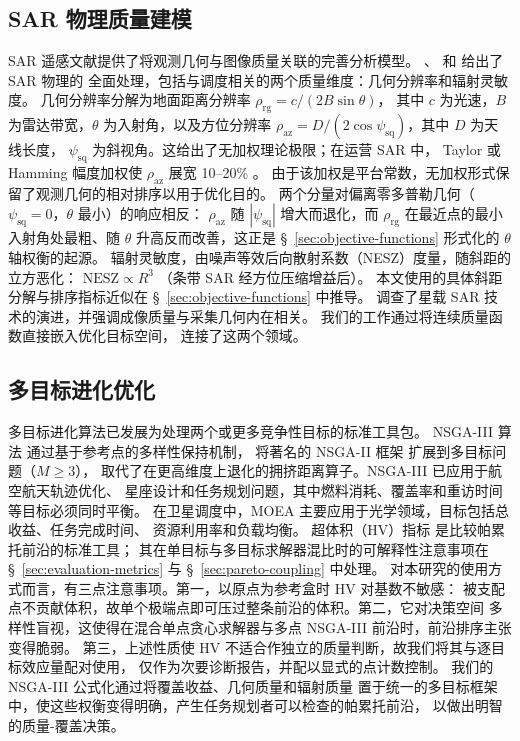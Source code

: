\documentclass[preprint,12pt,authoryear]{elsarticle}
\begin{document}
\subsection{SAR 物理质量建模}
SAR 遥感文献提供了将观测几何与图像质量关联的完善分析模型。
\citet{Curlander1991}、\citet{Cumming2005} 和 \citet{Moreira2026} 给出了 SAR 物理的
全面处理，包括与调度相关的两个质量维度：几何分辨率和辐射灵敏度。
几何分辨率分解为地面距离分辨率 $\rho_{\text{rg}} = c / (2B \sin\theta)$，
其中 $c$ 为光速，$B$ 为雷达带宽，$\theta$ 为入射角，以及方位分辨率
$\rho_{\text{az}} = D / (2 \cos\psi_{\text{sq}})$，其中 $D$ 为天线长度，
$\psi_{\text{sq}}$ 为斜视角。这给出了无加权理论极限；在运营 SAR 中，
Taylor 或 Hamming 幅度加权使 $\rho_{\text{az}}$ 展宽 10--20\% \citep{Curlander1991}。
由于该加权是平台常数，无加权形式保留了观测几何的相对排序以用于优化目的。
两个分量对偏离零多普勒几何（$\psi_{\text{sq}} = 0$，$\theta$ 最小）的响应相反：
$\rho_{\text{az}}$ 随 $|\psi_{\text{sq}}|$ 增大而退化，而 $\rho_{\text{rg}}$
在最近点的最小入射角处最粗、随 $\theta$ 升高反而改善，这正是
\S~\ref{sec:objective-functions} 形式化的 $\theta$ 轴权衡的起源。
辐射灵敏度，由噪声等效后向散射系数（NESZ）度量，随斜距的立方恶化：
$\text{NESZ} \propto R^3$
（条带 SAR 经方位压缩增益后）\citep{Curlander1991,Moreira2026}。
本文使用的具体斜距分解与排序指标近似在 \S~\ref{sec:objective-functions} 中推导。
\citet{Moreira2026} 调查了星载 SAR 技术的演进，并强调成像质量与采集几何内在相关。
我们的工作通过将连续质量函数直接嵌入优化目标空间，
连接了这两个领域。
\subsection{多目标进化优化}
多目标进化算法已发展为处理两个或更多竞争性目标的标准工具包。
NSGA-III 算法 \citep{Deb2014} 通过基于参考点的多样性保持机制，
将著名的 NSGA-II 框架 \citep{Deb2002NSGA2} 扩展到多目标问题（$M \geq 3$），
取代了在更高维度上退化的拥挤距离算子。NSGA-III 已应用于航空航天轨迹优化、
星座设计和任务规划问题，其中燃料消耗、覆盖率和重访时间等目标必须同时平衡。
在卫星调度中，MOEA 主要应用于光学领域，目标包括总收益、任务完成时间、
资源利用率和负载均衡。
超体积（HV）指标 \citep{Zitzler1999HV} 是比较帕累托前沿的标准工具；
其在单目标与多目标求解器混比时的可解释性注意事项在
\S~\ref{sec:evaluation-metrics} 与 \S~\ref{sec:pareto-coupling} 中处理。
对本研究的使用方式而言，有三点注意事项。第一，以原点为参考盒时 HV 对基数不敏感：
被支配点不贡献体积，故单个极端点即可压过整条前沿的体积。第二，它对决策空间
多样性盲视，这使得在混合单点贪心求解器与多点 NSGA-III 前沿时，前沿排序主张变得脆弱。
第三，上述性质使 HV 不适合作独立的质量判断，故我们将其与逐目标效应量配对使用，
仅作为次要诊断报告，并配以显式的点计数控制。
我们的 NSGA-III 公式化通过将覆盖收益、几何质量和辐射质量
置于统一的多目标框架中，使这些权衡变得明确，产生任务规划者可以检查的帕累托前沿，
以做出明智的质量-覆盖决策。
\end{document}
